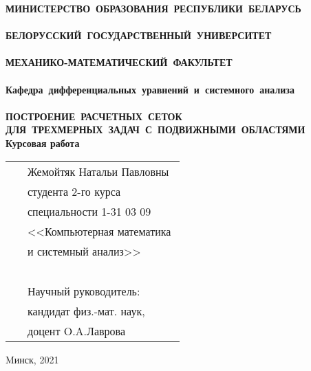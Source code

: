\setcounter{page}{1}
\thispagestyle{empty}
\begin{center}
\bf
\vspace{4cm}
{
\mbox{МИНИСТЕРСТВО~ОБРАЗОВАНИЯ~РЕСПУБЛИКИ~БЕЛАРУСЬ} \\~\\
\mbox{БЕЛОРУССКИЙ~ГОСУДАРСТВЕННЫЙ~УНИВЕРСИТЕТ} \\~\\
\mbox{МЕХАНИКО-МАТЕМАТИЧЕСКИЙ~ФАКУЛЬТЕТ} \\~\\
\mbox{Кафедра~дифференциальных~уравнений~и~системного~анализа} \\~\\
}
\vspace{3.5cm}
\bf
\mbox{ПОСТРОЕНИЕ РАСЧЕТНЫХ СЕТОК}\\
\mbox{ДЛЯ ТРЕХМЕРНЫХ ЗАДАЧ С ПОДВИЖНЫМИ ОБЛАСТЯМИ}\\
\vspace{0.75cm}
\rm Курсовая работа 
\vspace{3cm}
\end{center}
\begin{tabular}{ll}
\hspace{10cm}
&Жемойтяк Натальи Павловны~\\
&студента 2-го курса\\
&специальности 1-31 03 09\\
&<<Компьютерная математика\\
&и системный анализ>>\\~\\
&Научный руководитель:\\
&кандидат физ.-мат. наук,\\
&доцент O.A.Лаврова

\end{tabular}
\vspace{3.5cm}
\begin{center}
Mинск, 2021
\end{center}
\clearpage
\restoregeometry